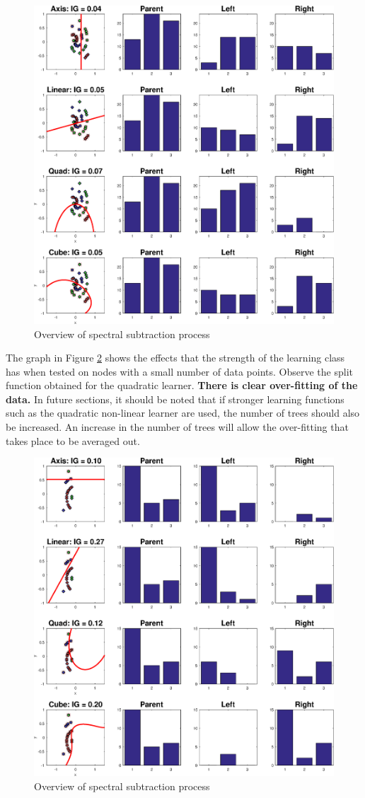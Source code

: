 \documentclass[a4paper,pra,twocolumn,10pt,aps,longbibliography,nobalancelastpage]{revtex4-1}
\begin{document}
\begin{figure}[H]
	\centering
    \includegraphics[width=0.60\columnwidth]{split_function_visualitions_1}
    \caption{Overview of spectral subtraction process}
    \label{fig:spec_sub_overview}
\end{figure}

The graph in Figure \ref{fig:spec_sub_overview} shows the effects that the strength of the learning class has when tested on nodes with a small number of data points. Observe the split function obtained for the quadratic learner. \textbf{There is clear over-fitting of the data.} In future sections, it should be noted that if stronger learning functions such as the quadratic non-linear learner are used, the number of trees should also be increased. An increase in the number of trees will allow the over-fitting that takes place to be averaged out. 

\begin{figure}[H]
	\centering
    \includegraphics[width=0.60\columnwidth]{split_function_visualitions_3}
    \caption{Overview of spectral subtraction process}
    \label{fig:spec_sub_overview}
\end{figure}
\end{document}
